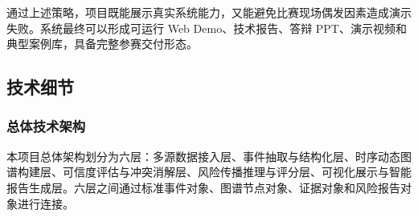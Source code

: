 ﻿\documentclass[12pt,a4paper]{article}
\begin{document}
通过上述策略，项目既能展示真实系统能力，又能避免比赛现场偶发因素造成演示失败。系统最终可以形成可运行 Web Demo、技术报告、答辩 PPT、演示视频和典型案例库，具备完整参赛交付形态。

\subsection{技术细节}

\subsubsection{总体技术架构}

本项目总体架构划分为六层：多源数据接入层、事件抽取与结构化层、时序动态图谱构建层、可信度评估与冲突消解层、风险传播推理与评分层、可视化展示与智能报告生成层。六层之间通过标准事件对象、图谱节点对象、证据对象和风险报告对象进行连接。
\end{document}
